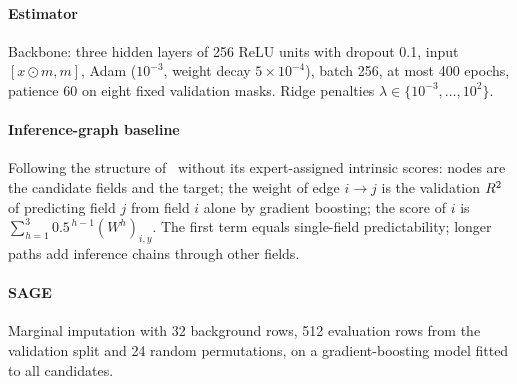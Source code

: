\paragraph{Estimator} Backbone: three hidden layers of 256 ReLU units with dropout 0.1, input
$[x\odot m, m]$, Adam ($10^{-3}$, weight decay $5\times10^{-4}$), batch 256, at most 400 epochs,
patience 60 on eight fixed validation masks. Ridge penalties $\lambda\in\{10^{-3},\dots,10^{2}\}$.

\paragraph{Inference-graph baseline} Following the structure of~\cite{hu2026ignn} without its
expert-assigned intrinsic scores: nodes are the candidate fields and the target; the weight of edge
$i\to j$ is the validation $R^2$ of predicting field $j$ from field $i$ alone by gradient boosting; the
score of $i$ is $\sum_{h=1}^{3}0.5^{\,h-1}(W^{h})_{i,y}$. The first term equals single-field
predictability; longer paths add inference chains through other fields.

\paragraph{SAGE} Marginal imputation with 32 background rows, 512 evaluation rows from the
validation split and 24 random permutations, on a gradient-boosting model fitted to all candidates.


